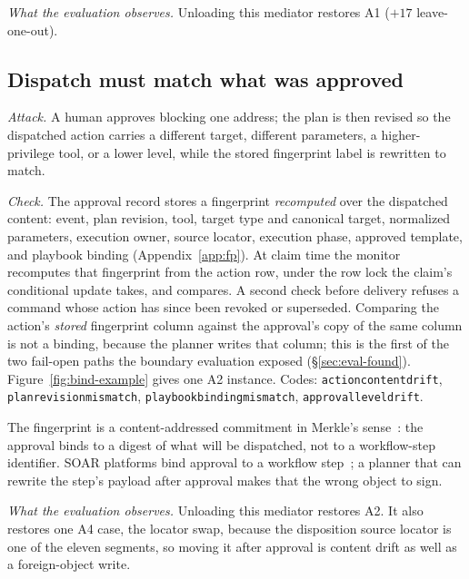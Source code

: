 \documentclass[acmsmall,manuscript,review,anonymous]{acmart}
\renewcommand{\_}{\discretionary{\textunderscore}{}{\textunderscore}}
\begin{document}
\emph{What the evaluation observes.} Unloading this mediator restores A1
($+17$ leave-one-out).

\subsection{Dispatch must match what was approved}
\label{sec:design-bind}

\emph{Attack.} A human approves blocking one address; the plan is then revised
so the dispatched action carries a different target, different parameters, a
higher-privilege tool, or a lower level, while the stored fingerprint label is
rewritten to match.

\emph{Check.} The approval record stores a fingerprint \emph{recomputed} over
the dispatched content: event, plan revision, tool, target type and canonical
target, normalized parameters, execution owner, source locator, execution phase,
approved template, and playbook binding (Appendix~\ref{app:fp}). At claim time
the monitor recomputes that fingerprint from the action row, under the row lock
the claim's conditional update takes, and compares. A second check before
delivery refuses a command whose action has since been revoked or superseded.
Comparing the action's \emph{stored} fingerprint column against the approval's
copy of the same column is not a binding, because the planner writes that
column; this is the first of the two fail-open paths the boundary evaluation
exposed (\S\ref{sec:eval-found}). Figure~\ref{fig:bind-example} gives one
A2 instance. Codes: \texttt{action\_content\_drift},
\texttt{plan\_revision\_mismatch}, \texttt{playbook\_binding\_mismatch},
\texttt{approval\_level\_drift}.

The fingerprint is a content-addressed commitment in Merkle's
sense~\cite{merkle1980protocols}: the approval binds to a digest of what will
be dispatched, not to a workflow-step identifier. SOAR platforms bind approval to a
workflow step~\cite{xsoar-manual-tasks}; a planner that can rewrite the
step's payload after approval makes that the wrong object to sign.

\emph{What the evaluation observes.} Unloading this mediator restores A2. It
also restores one A4 case, the locator swap, because the disposition source
locator is one of the eleven segments, so moving it after approval is content
drift as well as a foreign-object write.
\end{document}
